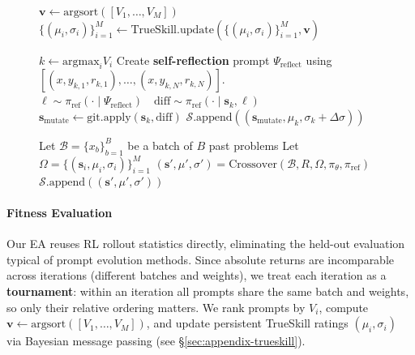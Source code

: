 \documentclass{article}
\theoremstyle{plain}
\theoremstyle{definition}
\theoremstyle{remark}
\begin{document}
\begin{figure}
\begin{minipage}{0.59\textwidth}
\begin{algorithm}[H]
\begin{algorithmic}
      \STATE $\mathbf{v} \leftarrow \mathrm{argsort}([V_{1},\dots, V_{M}])$ \hfill {}
      \STATE $\{(\mu_{i}, \sigma_{i})\}_{i=1}^{M} \leftarrow {\mathrm{TrueSkill}.\mathrm{update}}(\{(\mu_{i}, \sigma_{i})\}_{i=1}^{M}, \mathbf{v})$ \hfill {}
      \vspace{5pt}

      \STATE $k\leftarrow \mathrm{argmax}_{i} V_{i}$ \hfill {}
      \STATE Create {\color{magenta}\textbf{{} self-reflection}} prompt $\Psi_{\text{reflect}}$ using $[(x, y_{k,1}, r_{k,1}), \dots, (x, y_{k,N}, r_{k,N})]$.
      \STATE $\ell \sim \pi_{\text{ref}}(\cdot \mid \Psi_{\text{reflect}}) \quad \mathrm{diff} \sim \pi_{\text{ref}}(\cdot \mid \mathbf{s}_{k}, \ell)$
      \STATE $\mathbf{s}_{\text{mutate}} \leftarrow \mathrm{git}.\mathrm{apply}(\mathbf{s}_{k}, \mathrm{diff})$ \hfill {}
      \STATE $\mathcal{S}.\mathrm{append}((\mathbf{s}_{\text{mutate}}, \mu_{k}, \sigma_{k} + \Delta\sigma))$
      \vspace{5pt}

          \STATE Let $\mathcal{B} = \{ x_{b} \}_{b=1}^{B}$ be a batch of $B$ past problems
          \STATE Let $\Omega=\{(\mathbf{s}_{i}, \mu_i, \sigma_i)\}_{i=1}^{M}$
          \STATE $(\mathbf{s}', \mu', \sigma')=\mathrm{Crossover}(\mathcal{B}, R, \Omega, \pi_{\theta}, \pi_{\text{ref}} )$ \hfill  {}
          \STATE $\mathcal{S}.\mathrm{append}((\mathbf{s}', \mu', \sigma'))$
      \ENDIF
      \ENDWHILE
    \end{algorithmic}
  \end{algorithm}
  \end{minipage}
  \vspace{-25pt}
\end{figure}

\vspace{-5pt}
\paragraph{Fitness Evaluation}
Our EA reuses RL rollout statistics directly, eliminating the held-out evaluation typical of prompt evolution methods. Since absolute returns are incomparable across iterations (different batches and weights), we treat each iteration as a \textbf{tournament}: within an iteration all prompts share the same batch and weights, so only their relative ordering matters. We rank prompts by $V_i$, compute $\mathbf{v} \leftarrow \mathrm{argsort}([V_{1},\dots, V_{M}])$, and update persistent TrueSkill \citep{trueskill} ratings $(\mu_i, \sigma_i)$ via Bayesian message passing (see \S\ref{sec:appendix-trueskill}).
\end{document}
